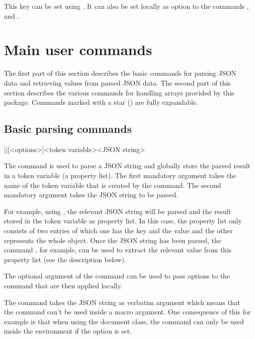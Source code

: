 \documentclass[a4paper]{article}
\begin{document}
{{This key can be set using \macro{\JSONParseSet}. It can also be set locally as option to the commands \macro{\JSONParseValue}, \macro{\JSONParseArrayUse} and \macro{\JSONParseArrayMapFunction}.

\section{Main user commands}

The first part of this section describes the basic commands for parsing JSON data and retrieving values from parsed JSON data. The second part of this section describes the various commands for handling arrays provided by this package. Commands marked with a star (\expandablestar) are fully expandable.

\subsection{Basic parsing commands}

\begin{macrodef}
|\JSONParse|[<options>]{<token variable>}{<JSON string>}
\end{macrodef}
The command \macro{\JSONParse} is used to parse a JSON string and globally store the parsed result in a token variable (a property list). The first mandatory argument takes the name of the token variable that is created by the command. The second mandatory argument takes the JSON string to be parsed.

For example, using , the relevant JSON string will be parsed and the result stored in the token variable \macro{\myJSONdata} as property list. In this case, the property list only consists of two entries of which one has the key  and the value  and the other represents the whole object. Once the JSON string has been parsed, the command , for example, can be used to extract the relevant value from this property list (see the description below).

The optional argument of the command \macro{\JSONParse} can be used to pass options to the command that are then applied locally.

\warning The command \macro{\JSONParse} takes the JSON string as verbatim argument which means that the command can't be used inside a macro argument. One consequence of this for example is that when using the  document class, the command \macro{\JSONParse} can only be used inside the  environment if the  option is set.

}}
\end{document}
